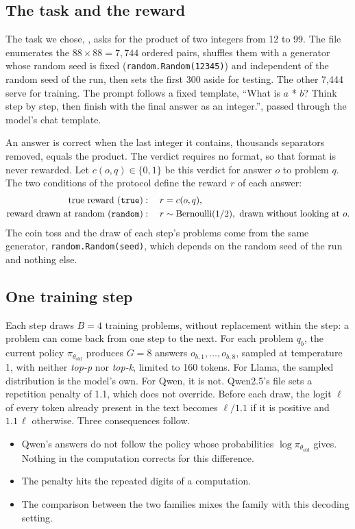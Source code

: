 \subsection{The task and the reward}

The task we chose, , asks for the product of two integers from 12 to 99. The file
enumerates the $88 \times 88 = 7{,}744$ ordered pairs, shuffles them with a generator whose random
seed is fixed (\texttt{random.Random(12345)}) and independent of the random seed of the run, then
sets the first 300 aside for testing. The other 7,444 serve for training. The prompt follows a fixed
template, \enquote{What is $a$ * $b$? Think step by step, then finish with the final answer as an
integer.}, passed through the model's chat template.

An answer is correct when the last integer it contains, thousands separators removed, equals the
product. The verdict requires no format, so that format is never rewarded. Let $c(o, q) \in \{0,1\}$
be this verdict for answer $o$ to problem $q$. The two conditions of the protocol define the reward
$r$ of each answer:
\begin{align}
  \text{true reward (\texttt{true})} &: \quad r = c(o, q),\\
  \text{reward drawn at random (\texttt{random})} &: \quad r \sim \mathrm{Bernoulli}(1/2),
  \text{ drawn without looking at } o.
\end{align}
The coin toss and the draw of each step's problems come from the same generator,
\texttt{random.Random(seed)}, which depends on the random seed of the run and nothing else.

\subsection{One training step}

Each step draws $B = 4$ training problems, without replacement within the step: a problem can come back
from one step to the next. For each problem $q_b$, the current policy $\pi_{\theta_{\text{old}}}$
produces $G = 8$ answers $o_{b,1}, \dots, o_{b,8}$, sampled at temperature 1, with neither \emph{top-p}
nor \emph{top-k}, limited to 160 tokens. For Llama, the sampled distribution is the model's own. For
Qwen, it is not. Qwen2.5's  file sets a repetition
penalty of 1.1, which  does not override. Before each draw, the logit $\ell$ of every token
already present in the text becomes $\ell/1.1$ if it is positive and $1.1\,\ell$ otherwise. Three
consequences follow.
\begin{itemize}
  \item Qwen's answers do not follow the policy whose probabilities $\log \pi_{\theta_{\text{old}}}$
        gives. Nothing in the computation corrects for this difference.
  \item The penalty hits the repeated digits of a computation.
  \item The comparison between the two families mixes the family with this decoding setting.
\end{itemize}

